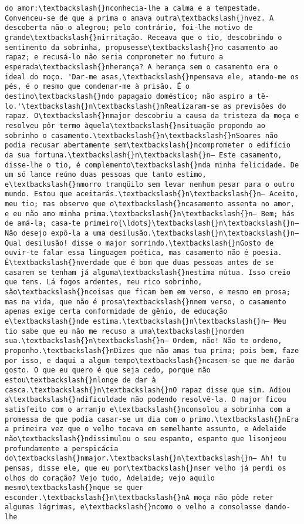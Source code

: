 \begin{Verbatim}[commandchars=\\\{\}]
do amor:\textbackslash{}nconhecia-lhe a calma e a tempestade. Convenceu-se de que a prima o amava outra\textbackslash{}nvez. A descoberta não o alegrou; pelo contrário, foi-lhe motivo de grande\textbackslash{}nirritação. Receava que o tio, descobrindo o sentimento da sobrinha, propusesse\textbackslash{}no casamento ao rapaz; e recusá-lo não seria comprometer no futuro a esperada\textbackslash{}nherança? A herança sem o casamento era o ideal do moço. 'Dar-me asas,\textbackslash{}npensava ele, atando-me os pés, é o mesmo que condenar-me à prisão. É o destino\textbackslash{}ndo papagaio doméstico; não aspiro a tê-lo.'\textbackslash{}n\textbackslash{}nRealizaram-se as previsões do rapaz. O\textbackslash{}nmajor descobriu a causa da tristeza da moça e resolveu pôr termo àquela\textbackslash{}nsituação propondo ao sobrinho o casamento.\textbackslash{}n\textbackslash{}nSoares não podia recusar abertamente sem\textbackslash{}ncomprometer o edifício da sua fortuna.\textbackslash{}n\textbackslash{}n— Este casamento, disse-lhe o tio, é complemento\textbackslash{}nda minha felicidade. De um só lance reúno duas pessoas que tanto estimo, e\textbackslash{}nmorro tranqüilo sem levar nenhum pesar para o outro mundo. Estou que aceitarás.\textbackslash{}n\textbackslash{}n— Aceito, meu tio; mas observo que o\textbackslash{}ncasamento assenta no amor, e eu não amo minha prima.\textbackslash{}n\textbackslash{}n— Bem; hás de amá-la; casa-te primeiro{\ldots}\textbackslash{}n\textbackslash{}n— Não desejo expô-la a uma desilusão.\textbackslash{}n\textbackslash{}n— Qual desilusão! disse o major sorrindo.\textbackslash{}nGosto de ouvir-te falar essa linguagem poética, mas casamento não é poesia. É\textbackslash{}nverdade que é bom que duas pessoas antes de se casarem se tenham já alguma\textbackslash{}nestima mútua. Isso creio que tens. Lá fogos ardentes, meu rico sobrinho, são\textbackslash{}ncoisas que ficam bem em verso, e mesmo em prosa; mas na vida, que não é prosa\textbackslash{}nnem verso, o casamento apenas exige certa conformidade de gênio, de educação e\textbackslash{}nde estima.\textbackslash{}n\textbackslash{}n— Meu tio sabe que eu não me recuso a uma\textbackslash{}nordem sua.\textbackslash{}n\textbackslash{}n— Ordem, não! Não te ordeno, proponho.\textbackslash{}nDizes que não amas tua prima; pois bem, faze por isso, e daqui a algum tempo\textbackslash{}ncasem-se que me darão gosto. O que eu quero é que seja cedo, porque não estou\textbackslash{}nlonge de dar à casca.\textbackslash{}n\textbackslash{}nO rapaz disse que sim. Adiou a\textbackslash{}ndificuldade não podendo resolvê-la. O major ficou satisfeito com o arranjo e\textbackslash{}nconsolou a sobrinha com a promessa de que podia casar-se um dia com o primo.\textbackslash{}nEra a primeira vez que o velho tocava em semelhante assunto, e Adelaide não\textbackslash{}ndissimulou o seu espanto, espanto que lisonjeou profundamente a perspicácia do\textbackslash{}nmajor.\textbackslash{}n\textbackslash{}n— Ah! tu pensas, disse ele, que eu por\textbackslash{}nser velho já perdi os olhos do coração? Vejo tudo, Adelaide; vejo aquilo mesmo\textbackslash{}nque se quer esconder.\textbackslash{}n\textbackslash{}nA moça não pôde reter algumas lágrimas, e\textbackslash{}ncomo o velho a consolasse dando-lhe 
\end{Verbatim}
